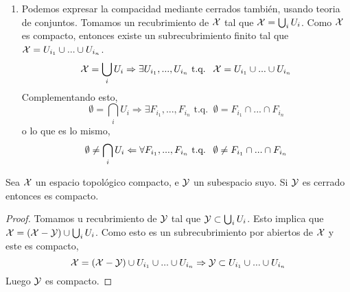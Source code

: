 \begin{obs}
\begin{enumerate}
\begin{proof}
\begin{enumerate}
				\item[\bla] Sea $\A'=\{A'_{i}\}$ un cubrimiento de $\Y$ por abiertos de $\Y$. Para cada $i$ podemos elegir un conjunto $A_i$ abierto en $\X$ tal que 
					\begin{equation*}
							\A'_i=A_i \cap \Y
					\end{equation*}
					La colección formada por estos $A_i$ a la que llamaremos $\A$ es un recubrimiento de $\Y$ por abiertos de $\A$. Por hipótesis, algun subrecubrimiento finito $\{A_{i_1},...,A_{i_n}\}$ que cubre $\Y$. Entonces $\{A'_{i_1},...,A'_{i_n}\}$ es una subrecubrimiento finito de $\Y$, luego $\Y$ es compacto. \qedhere
			\end{enumerate}
		\end{proof}
		\item Podemos expresar la compacidad mediante cerrados también, usando teoria de conjuntos.
		Tomamos un recubrimiento de $\X$ tal que $\mathcal{X} = \bigcup_{i}U_i$. Como $\X$ es compacto, entonces existe un subrecubrimiento finito tal que $\mathcal{X} = U_{i_1} \cup ... \cup U_{i_n}$.
		\begin{equation*}
			\mathcal{X} = \bigcup_{i}U_i \Rightarrow \exists U_{i_1},..., U_{i_n} \text{ t.q. }\ \mathcal{X} = U_{i_1} \cup ... \cup U_{i_n}
		\end{equation*}
		Complementando esto,
		\begin{equation*}
			\emptyset = \bigcap_{i}U_i \Rightarrow \exists F_{i_1},..., F_{i_n} \text{ t.q. }\ \emptyset = F_{i_1} \cap ... \cap F_{i_n}
		\end{equation*}
		o lo que es lo mismo,
		\begin{equation*}
			\emptyset \neq \bigcap_{i}U_i \Leftarrow \forall F_{i_1},..., F_{i_n} \text{ t.q. }\ \emptyset \neq F_{i_1} \cap ... \cap F_{i_n} \qedhere
		\end{equation*}
	\end{enumerate}
\end{obs}


\begin{prop}
	\label{cerra_en_comp_comp}
	Sea $\X$ un espacio topológico compacto, e $\Y$ un subespacio suyo. Si $\Y$ es cerrado entonces es compacto.
	\begin{proof}
		Tomamos u recubrimiento de $\Y$ tal que $\mathcal{Y} \subset \bigcup_{i}U_i$. Esto implica que $\mathcal{X} = (\mathcal{X}-\mathcal{Y}) \cup \bigcup_{i}U_i$. Como esto es un subrecubrimiento por abiertos de $\X$ y este es compacto,
		\begin{equation*}
			\mathcal{X} = (\mathcal{X}-\mathcal{Y}) \cup U_{i_1} \cup ... \cup U_{i_n} \Rightarrow \mathcal{Y} \subset U_{i_1} \cup ... \cup U_{i_n}
		\end{equation*}
		Luego $\Y$ es compacto.
	\end{proof}
\end{prop}


